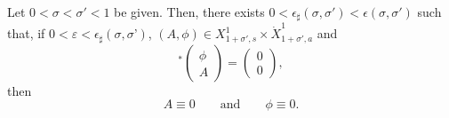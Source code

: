 \documentclass[AHL,Unicode,longabstracts,published]{cedram}
\newcommand*\e{\varepsilon}
\newcommand*\ep{\epsilon}
\newcommand*\s{\sigma}
\begin{document}
\begin{lemm}\label{adj_inj_plan}
Let $ 0 < \s < \s' < 1 $ be given. Then, there exists $ 0 < \ep_\sharp(\s, \s') < \ep (\s, \s') $ such that, if $
0<\varepsilon<\epsilon_\sharp(\sigma, \sigma’)$, $ (A, \phi) \in X^{1}_{ 1+\s', s} \times \dot{X}^{1}_{ 1+ \s',a} $ and
\begin{equation*}
[\Lambda^\e]^*
\begin{pmatrix}
\phi \\ A
\end{pmatrix} =
\begin{pmatrix} 0 \\ 0
\end{pmatrix},
\end{equation*}
then
\[
A \equiv 0
\qquad \text{and} \qquad
\phi \equiv 0.
\]
\end{lemm}
\end{document}
